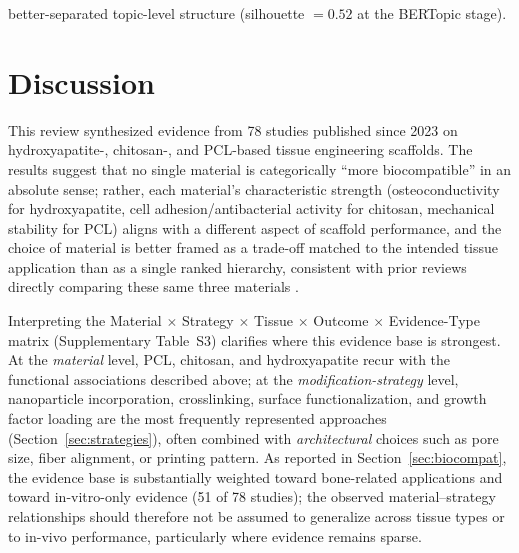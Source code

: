 \documentclass[5p,times,twocolumn]{elsarticle}
\begin{document}
better-separated topic-level structure (silhouette $=0.52$ at the BERTopic stage).

\section{Discussion}
\label{sec:discussion}

This review synthesized evidence from 78 studies published since 2023 on hydroxyapatite-, chitosan-, and PCL-based tissue engineering scaffolds. The results suggest that no single material is categorically ``more biocompatible'' in an absolute sense; rather, each material's characteristic strength (osteoconductivity for hydroxyapatite, cell adhesion/antibacterial activity for chitosan, mechanical stability for PCL) aligns with a different aspect of scaffold performance, and the choice of material is better framed as a trade-off matched to the intended tissue application than as a single ranked hierarchy, consistent with prior reviews directly comparing these same three materials \cite{ref83}.

Interpreting the Material $\times$ Strategy $\times$ Tissue $\times$ Outcome $\times$ Evidence-Type matrix (Supplementary Table~S3) clarifies where this evidence base is strongest. At the \emph{material} level, PCL, chitosan, and hydroxyapatite recur with the functional associations described above; at the \emph{modification-strategy} level, nanoparticle incorporation, crosslinking, surface functionalization, and growth factor loading are the most frequently represented approaches (Section~\ref{sec:strategies}), often combined with \emph{architectural} choices such as pore size, fiber alignment, or printing pattern. As reported in Section~\ref{sec:biocompat}, the evidence base is substantially weighted toward bone-related applications and toward in-vitro-only evidence (51 of 78 studies); the observed material--strategy relationships should therefore not be assumed to generalize across tissue types or to in-vivo performance, particularly where evidence remains sparse.
\end{document}
